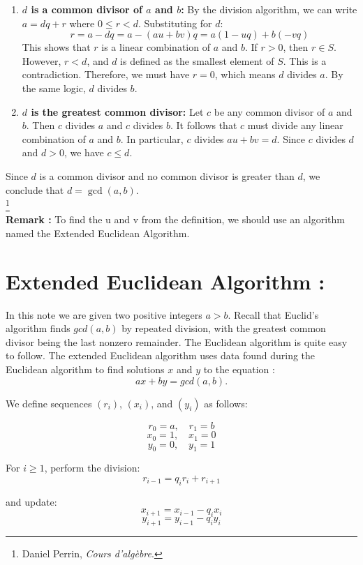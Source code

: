 \begin{enumerate}
    \item \textbf{$d$ is a common divisor of $a$ and $b$:}
    By the division algorithm, we can write $a = dq + r$ where $0 \leq r < d$. Substituting for $d$:
    \[ r = a - dq = a - (au + bv)q = a(1 - uq) + b(-vq) \]
    This shows that $r$ is a linear combination of $a$ and $b$. If $r > 0$, then $r \in S$. However, $r < d$, and $d$ is defined as the smallest element of $S$. This is a contradiction. Therefore, we must have $r = 0$, which means $d$ divides $a$. By the same logic, $d$ divides $b$.
    
    \item \textbf{$d$ is the greatest common divisor:}
    Let $c$ be any common divisor of $a$ and $b$. Then $c$ divides $a$ and $c$ divides $b$. It follows that $c$ must divide any linear combination of $a$ and $b$. In particular, $c$ divides $au + bv = d$. Since $c$ divides $d$ and $d > 0$, we have $c \leq d$.
\end{enumerate}

Since $d$ is a common divisor and no common divisor is greater than $d$, we conclude that $d = \gcd(a, b)$.\\
\footnote{Daniel Perrin, \textit{Cours d’algèbre}.}\\
\textbf{Remark :} To find the u and v from the definition, we should use an algorithm named the Extended Euclidean Algorithm.
\section{Extended Euclidean Algorithm :}

In this note we are given two positive integers $a > b$. Recall that Euclid’s algorithm
finds $gcd(a,b)$ by repeated division, with the greatest common divisor being the
last nonzero remainder.
The Euclidean algorithm is quite easy to follow. The extended Euclidean algorithm uses data found during the Euclidean algorithm to find solutions $x$ and $y$ to
the equation :
$$ax +by = gcd(a,b).$$


We define sequences $(r_i)$, $(x_i)$, and $(y_i)$ as follows:

\[
r_0 = a, \quad r_1 = b
\]
\[
x_0 = 1, \quad x_1 = 0
\]
\[
y_0 = 0, \quad y_1 = 1
\]

For $i \geq 1$, perform the division:
\[
r_{i-1} = q_i r_i + r_{i+1}
\]

and update:
\[
x_{i+1} = x_{i-1} - q_i x_i
\]
\[
y_{i+1} = y_{i-1} - q_i y_i
\]

